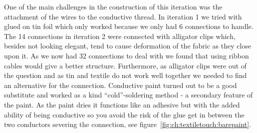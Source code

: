 One of the main challenges in the construction of this iteration was the attachment of the wires to the conductive thread.
In iteration 1 we tried with glued on tin foil which only worked because we only had 6 connections to handle.
The 14 connections in iteration 2 were connected with alligator clips which, besides not looking elegant, tend to cause deformation of the fabric as they close upon it.
As we now had 32 connections to deal with we found that using ribbon cables would give a better structure.
Furthermore, as alligator clips were out of the question and as tin and textile do not work well together we needed to find an alternative for the connection.
Conductive paint turned out to be a good substitute and worked as a kind ``cold''-soldering method - a secondary feature of the paint.
As the paint dries it functions like an adhesive but with the added ability of being conductive so you avoid the risk of the glue get in between the two conductors severing the connection, see figure~\ref{fig:ch:textiletouch:barepaint}.

